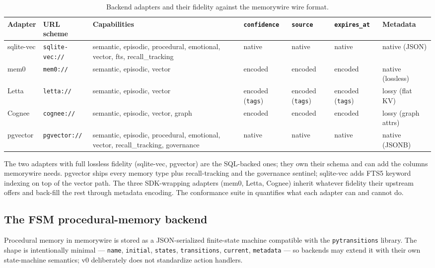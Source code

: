 \documentclass[11pt,letterpaper,twocolumn]{article}
\begin{document}
\begin{table}[t]
\centering
\caption{Backend adapters and their fidelity against the memorywire wire format.}
\label{tab:adapters}
\small
\begin{tabularx}{\textwidth}{l l X l l l l}
\toprule
\textbf{Adapter} & \textbf{URL scheme} & \textbf{Capabilities} & \texttt{confidence} & \texttt{source} & \texttt{expires\_at} & \textbf{Metadata} \\
\midrule
sqlite-vec & \texttt{sqlite-vec://} & semantic, episodic, procedural, emotional, vector, fts, recall\_tracking & native & native & native & native (JSON) \\
mem0       & \texttt{mem0://}       & semantic, episodic, vector & encoded & encoded & encoded & native (lossless) \\
Letta      & \texttt{letta://}      & semantic, episodic, vector & encoded (\texttt{tags}) & encoded (\texttt{tags}) & encoded (\texttt{tags}) & lossy (flat KV) \\
Cognee     & \texttt{cognee://}     & semantic, episodic, vector, graph & encoded & encoded & encoded & lossy (graph attrs) \\
pgvector   & \texttt{pgvector://}   & semantic, episodic, procedural, emotional, vector, recall\_tracking, governance & native & native & native & native (JSONB) \\
\bottomrule
\end{tabularx}
\end{table}

The two adapters with full lossless fidelity (sqlite-vec, pgvector) are the SQL-backed ones; they own their schema and can add the columns memorywire needs. pgvector ships every memory type plus recall-tracking and the governance sentinel; sqlite-vec adds FTS5 keyword indexing on top of the vector path. The three SDK-wrapping adapters (mem0, Letta, Cognee) inherit whatever fidelity their upstream offers and back-fill the rest through metadata encoding. The conformance suite in  quantifies what each adapter can and cannot do.

\subsection{The FSM procedural-memory backend}
\label{sec:impl-fsm}

Procedural memory in memorywire is stored as a JSON-serialized finite-state machine compatible with the \texttt{pytransitions} library. The shape is intentionally minimal --- \texttt{name}, \texttt{initial}, \texttt{states}, \texttt{transitions}, \texttt{current}, \texttt{metadata} --- so backends may extend it with their own state-machine semantics; v0 deliberately does not standardize action handlers.
\end{document}
